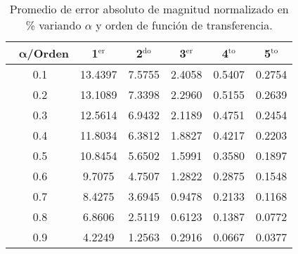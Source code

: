 \begin{table}[!ht]                                 
\centering            
\caption{Promedio de error absoluto de magnitud normalizado en \% variando $\alpha$ y orden de función de transferencia.}                           
\label{tab:prom_error_mag_norm}                               
\begin{tabular}{cccccc}
\hline                                             
$\,\,\,\,\bm{\alpha}$\textbf{/Orden} & \textbf{1$^{\mathrm{er}}$} & \textbf{2$^{\mathrm{do}}$} & \textbf{3$^{\mathrm{er}}$} & \textbf{4$^{\mathrm{to}}$} & \textbf{5$^{\mathrm{to}}$} \\                     
\hline                                             
0.1 & 13.4397 & 7.5755 & 2.4058 & 0.5407 & 0.2754 \\
                                         
0.2 & 13.1089 & 7.3398 & 2.2960 & 0.5155 & 0.2639 \\
                                              
0.3 & 12.5614 & 6.9432 & 2.1189 & 0.4751 & 0.2454 \\
                                            
0.4 & 11.8034 & 6.3812 & 1.8827 & 0.4217 & 0.2203 \\
                                            
0.5 & 10.8454 & 5.6502 & 1.5991 & 0.3580 & 0.1897 \\
                                           
0.6 & 9.7075 & 4.7507 & 1.2822 & 0.2875 & 0.1548 \\ 
                                         
0.7 & 8.4275 & 3.6945 & 0.9478 & 0.2133 & 0.1168 \\ 
                                              
0.8 & 6.8606 & 2.5119 & 0.6123 & 0.1387 & 0.0772 \\ 
                                             
0.9 & 4.2249 & 1.2563 & 0.2916 & 0.0667 & 0.0377 \\ 
\hline                                             
\end{tabular}                                                             
\end{table}


